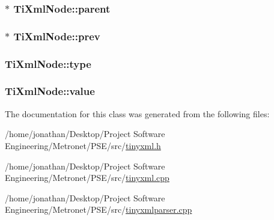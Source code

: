 \subsubsection[{\texorpdfstring{parent}{parent}}]{$\ast$ Ti\+Xml\+Node\+::parent\hspace{0.3cm}{\ttfamily [protected]}}\hypertarget{class_ti_xml_node_a662c4de61244e4fa5bd4e2d8c63143a5}{}\label{class_ti_xml_node_a662c4de61244e4fa5bd4e2d8c63143a5}
\subsubsection[{\texorpdfstring{prev}{prev}}]{$\ast$ Ti\+Xml\+Node\+::prev\hspace{0.3cm}{\ttfamily [protected]}}\hypertarget{class_ti_xml_node_a9c5370ea2cbfd9f0e0f7b30a57fd68f5}{}\label{class_ti_xml_node_a9c5370ea2cbfd9f0e0f7b30a57fd68f5}
\subsubsection[{\texorpdfstring{type}{type}}]{ Ti\+Xml\+Node\+::type\hspace{0.3cm}{\ttfamily [protected]}}\hypertarget{class_ti_xml_node_a2619c6379181c16ba95ae6922e2ca839}{}\label{class_ti_xml_node_a2619c6379181c16ba95ae6922e2ca839}
\subsubsection[{\texorpdfstring{value}{value}}]{ Ti\+Xml\+Node\+::value\hspace{0.3cm}{\ttfamily [protected]}}\hypertarget{class_ti_xml_node_aead528b3cedc33c16a6c539872c7cc8b}{}\label{class_ti_xml_node_aead528b3cedc33c16a6c539872c7cc8b}


The documentation for this class was generated from the following files\+:\begin{DoxyCompactItemize}
\item 
/home/jonathan/\+Desktop/\+Project Software Engineering/\+Metronet/\+P\+S\+E/src/\hyperlink{tinyxml_8h}{tinyxml.\+h}\item 
/home/jonathan/\+Desktop/\+Project Software Engineering/\+Metronet/\+P\+S\+E/src/\hyperlink{tinyxml_8cpp}{tinyxml.\+cpp}\item 
/home/jonathan/\+Desktop/\+Project Software Engineering/\+Metronet/\+P\+S\+E/src/\hyperlink{tinyxmlparser_8cpp}{tinyxmlparser.\+cpp}\end{DoxyCompactItemize}
